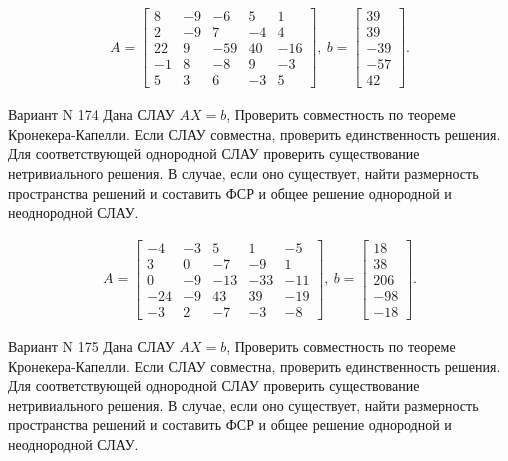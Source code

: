 \documentclass[11pt]{report}
\begin{document}
\begin{align*}
 A = \left[\begin{matrix}8 & -9 & -6 & 5 & 1\\2 & -9 & 7 & -4 & 4\\22 & 9 & -59 & 40 & -16\\-1 & 8 & -8 & 9 & -3\\5 & 3 & 6 & -3 & 5\end{matrix}\right],
\ b = \left[\begin{matrix}39\\39\\-39\\-57\\42\end{matrix}\right]. 
 \end{align*}

Вариант N 174
Дана СЛАУ $AX = b$,
Проверить совместность по теореме Кронекера-Капелли. Если СЛАУ совместна, проверить единственность решения.
Для соответствующей однородной СЛАУ проверить существование нетривиального решения. В случае, если оно существует,
найти размерность пространства решений и составить ФСР и общее решение однородной  и неоднородной СЛАУ.


\begin{align*}
 A = \left[\begin{matrix}-4 & -3 & 5 & 1 & -5\\3 & 0 & -7 & -9 & 1\\0 & -9 & -13 & -33 & -11\\-24 & -9 & 43 & 39 & -19\\-3 & 2 & -7 & -3 & -8\end{matrix}\right],
\ b = \left[\begin{matrix}18\\38\\206\\-98\\-18\end{matrix}\right]. 
 \end{align*}

Вариант N 175
Дана СЛАУ $AX = b$,
Проверить совместность по теореме Кронекера-Капелли. Если СЛАУ совместна, проверить единственность решения.
Для соответствующей однородной СЛАУ проверить существование нетривиального решения. В случае, если оно существует,
найти размерность пространства решений и составить ФСР и общее решение однородной  и неоднородной СЛАУ.
\end{document}
